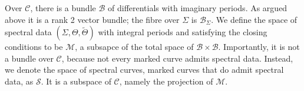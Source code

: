 Over $\mathcal{C}$, there is a bundle $\mathcal{B}$ of differentials with imaginary periods. As argued above it is a rank 2 vector bundle; the fibre over $Σ$ is $\mathcal{B}_Σ$. We define the space of spectral data $(Σ,Θ,\tilde{Θ})$ with integral periods and satisfying the closing conditions to be $\mathcal{M}$, a subsapce of the total space of $\mathcal{B}\times\mathcal{B}$. Importantly, it is not a bundle over $\mathcal{C}$, because not every marked curve admits spectral data. Instead, we denote the space of spectral curves, marked curves that do admit spectral data, as $\mathcal{S}$. It is a subspace of $\mathcal{C}$, namely the projection of $\mathcal{M}$.











\starttocentries
